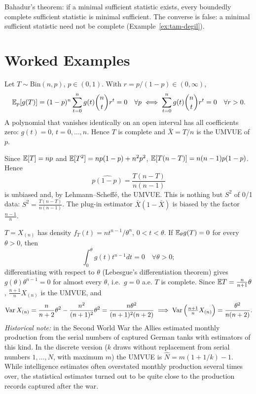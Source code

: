 \documentclass[main.tex]{subfiles}
\begin{document}
\begin{remark}
Bahadur's theorem: if a minimal sufficient statistic exists, every boundedly complete sufficient statistic is minimal sufficient. The converse is false: a minimal sufficient statistic need not be complete (Example~\ref{ex:tam-degil}).
\end{remark}

\section{Worked Examples}

\begin{example}\label{ex:binom-tam}
Let $T\sim\text{Bin}(n,p)$, $p\in(0,1)$. With $r=p/(1-p)\in(0,\infty)$,
\[
\mathbb{E}_p[g(T)]=(1-p)^n\sum_{t=0}^n g(t)\binom nt r^t=0\quad\forall p\iff\sum_{t=0}^n g(t)\binom nt r^t=0\quad\forall r>0 .
\]
A polynomial that vanishes identically on an open interval has all coefficients zero: $g(t)=0$, $t=0,\dots,n$. Hence $T$ is complete and $\bar X=T/n$ is the UMVUE of $p$.
\end{example}

\begin{example}
Since $\mathbb{E}[T]=np$ and $\mathbb{E}[T^2]=np(1-p)+n^2p^2$, $\mathbb{E}[T(n-T)]=n(n-1)p(1-p)$. Hence
\[
\widehat{p(1-p)}=\frac{T(n-T)}{n(n-1)}
\]
is unbiased and, by Lehmann--Scheffé, the UMVUE. This is nothing but $S^2$ of 0/1 data: $S^2=\frac{T(n-T)}{n(n-1)}$. The plug-in estimator $\bar X(1-\bar X)$ is biased by the factor $\frac{n-1}{n}$.
\end{example}

\begin{example}\label{ex:alman-tanki}
$T=X_{(n)}$ has density $f_T(t)=nt^{n-1}/\theta^n$, $0<t<\theta$. If $\mathbb{E}_\theta g(T)=0$ for every $\theta>0$, then
\[
\int_0^\theta g(t)t^{n-1}dt=0\quad\forall\theta>0 ;
\]
differentiating with respect to $\theta$ (Lebesgue's differentiation theorem) gives $g(\theta)\theta^{n-1}=0$ for almost every $\theta$, i.e.\ $g=0$ a.e. $T$ is complete. Since $\mathbb{E} T=\frac{n}{n+1}\theta$, $\frac{n+1}{n}X_{(n)}$ is the UMVUE, and
\[
\operatorname{Var} X_{(n)}=\frac{n}{n+2}\theta^2-\frac{n^2}{(n+1)^2}\theta^2=\frac{n\theta^2}{(n+1)^2(n+2)}\implies\operatorname{Var}\Big(\tfrac{n+1}{n}X_{(n)}\Big)=\frac{\theta^2}{n(n+2)} .
\]
\emph{Historical note:} in the Second World War the Allies estimated monthly production from the serial numbers of captured German tanks with estimators of this kind. In the discrete version ($k$ draws without replacement from serial numbers $1,\dots,N$, with maximum $m$) the UMVUE is $\hat N=m(1+1/k)-1$. While intelligence estimates often overstated monthly production several times over, the statistical estimates turned out to be quite close to the production records captured after the war.
\end{example}
\end{document}
